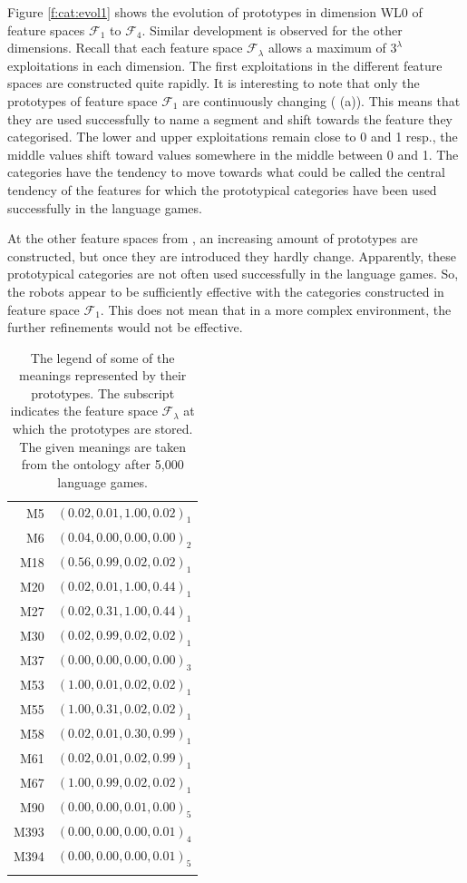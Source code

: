 Figure \ref{f:cat:evol1} shows the evolution of prototypes in dimension WL0 of feature spaces ${\mathcal F}_1$ to ${\mathcal F}_4$. Similar development is observed for the other dimensions. Recall that each feature space ${\mathcal F}_\lambda$ allows a maximum of $3^\lambda$ exploitations in each dimension. The first exploitations in the different feature spaces are constructed quite rapidly. It is interesting to note that only the prototypes of feature space ${\mathcal F}_1$  are continuously changing ( (a)). This means that they are used successfully to name a segment and shift towards the feature they categorised. The lower and upper exploitations remain close to 0 and 1 resp., the middle values shift toward values somewhere in the middle between 0 and 1. The categories have the tendency to move towards what could be called the central tendency of the features for which the prototypical categories have been used successfully in the language games. 

At the other feature spaces from , an increasing amount of prototypes are constructed, but once they are introduced they hardly change. Apparently, these prototypical categories are not often used successfully in the language games. So, the robots appear to be sufficiently effective with the categories constructed in feature space ${\mathcal F}_1$. This does not mean that in a more complex environment, the further refinements would not be effective.

\begin{table}
\centering
\begin{tabular}{rr}
\lsptoprule
M5 & $(0.02, 0.01, 1.00, 0.02)_1$\\%
M6 & $(0.04, 0.00, 0.00, 0.00)_2$\\%
M18 & $(0.56, 0.99, 0.02, 0.02)_1$\\%
M20 & $(0.02, 0.01, 1.00, 0.44)_1$\\%
M27 & $(0.02, 0.31, 1.00, 0.44)_1$\\%
M30 & $(0.02, 0.99, 0.02, 0.02)_1$\\%
M37 & $(0.00, 0.00, 0.00, 0.00)_3$\\%
M53 & $(1.00, 0.01, 0.02, 0.02)_1$\\%
M55 & $(1.00, 0.31, 0.02, 0.02)_1$\\%
M58 & $(0.02, 0.01, 0.30, 0.99)_1$\\%
M61 & $(0.02, 0.01, 0.02, 0.99)_1$\\%
M67 & $(1.00, 0.99, 0.02, 0.02)_1$\\%
M90 & $(0.00, 0.00, 0.01, 0.00)_5$\\%
M393 & $(0.00, 0.00, 0.00, 0.01)_4$\\%
M394 & $(0.00, 0.00, 0.00, 0.01)_5$\\%
\lspbottomrule
\end{tabular}
\caption{The legend of some of the meanings represented by their prototypes. The subscript indicates the feature space ${\mathcal F}_\lambda$ at which the prototypes are stored. The given meanings are taken from the ontology after 5,000 language games.}
\label{t:st:legend}
\end{table}


